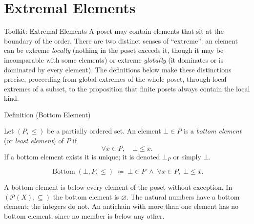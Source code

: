 
\section{Extremal Elements}
\label{sec:extremal-elements}

\begin{toolkitbox}{Toolkit: Extremal Elements}
A poset may contain elements that sit at the boundary of the order.  There
are two distinct senses of ``extreme'': an element can be extreme
\emph{locally} (nothing in the poset exceeds it, though it may be
incomparable with some elements) or extreme \emph{globally} (it dominates
or is dominated by every element).  The definitions below make these
distinctions precise, proceeding from global extremes of the whole poset,
through local extremes of a subset, to the proposition that finite posets
always contain the local kind.
\end{toolkitbox}


\begin{definitionbox}{Definition (Bottom Element)}
\begin{definition}
\label{def:bottom-element}
Let $(P, \leq)$ be a partially ordered set.  An element $\bot \in P$ is
a \emph{bottom element} (or \emph{least element}) of $P$ if
\[
\forall x \in P, \quad \bot \leq x.
\]
If a bottom element exists it is unique; it is denoted $\bot_P$ or
simply $\bot$.
\end{definition}
\end{definitionbox}

\begin{remark*}
\[
\operatorname{Bottom}(\bot, P, \leq)
\;\coloneqq\;
\bot \in P \;\land\; \forall x \in P,\; \bot \leq x.
\]
\end{remark*}

\begin{remark*}[Interpretation]
A bottom element is below every element of the poset without exception.
In $(\mathcal{P}(X), \subseteq)$ the bottom element is $\varnothing$.
The natural numbers have a bottom element; the integers do not.
An antichain with more than one element has no bottom element, since no
member is below any other.
\end{remark*}

